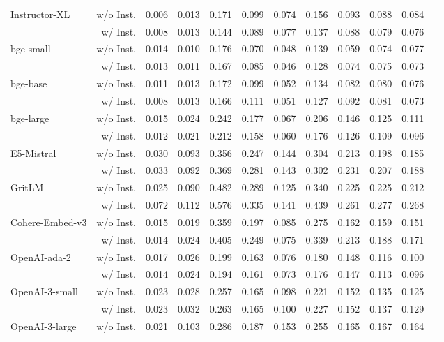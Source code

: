 \begin{table}[!tp]
{\begin{tabular}{lr|ccccccc|ccc}
\multirow{2}{*}{Instructor-XL} & w/o Inst. & 0.006 & 0.013 & 0.171 & 0.099 & 0.074 & 0.156 & 0.093 & 0.088 & 0.084 \\
& w/ Inst. & 0.008 & 0.013 & 0.144 & 0.089 & 0.077 & 0.137 & 0.088 & 0.079 & 0.076 \\
\multirow{2}{*}{bge-small} & w/o Inst. & 0.014 & 0.010 & 0.176 & 0.070 & 0.048 & 0.139 & 0.059 & 0.074 & 0.077 \\
& w/ Inst. & 0.013 & 0.011 & 0.167 & 0.085 & 0.046 & 0.128 & 0.074 & 0.075 & 0.073 \\
\multirow{2}{*}{bge-base} & w/o Inst. & 0.011 & 0.013 & 0.172 & 0.099 & 0.052 & 0.134 & 0.082 & 0.080 & 0.076 \\
& w/ Inst. & 0.008 & 0.013 & 0.166 & 0.111 & 0.051 & 0.127 & 0.092 & 0.081 & 0.073 \\
\multirow{2}{*}{bge-large} & w/o Inst. & 0.015 & 0.024 & 0.242 & 0.177 & 0.067 & 0.206 & 0.146 & 0.125 & 0.111 \\
& w/ Inst. & 0.012 & 0.021 & 0.212 & 0.158 & 0.060 & 0.176 & 0.126 & 0.109 & 0.096 \\
\multirow{2}{*}{E5-Mistral}	& w/o Inst.	&0.030	&0.093	&0.356	&0.247	&0.144	&0.304	&0.213	&0.198	&0.185\\
&w/ Inst.	&0.033	&0.092	&0.369	&0.281	&0.143	&0.302	&0.231	&0.207	&0.188\\
\multirow{2}{*}{GritLM}	& w/o Inst.	&0.025	&0.090	&0.482	&0.289	&0.125	&0.340	&0.225	&0.225	&0.212\\
&w/ Inst.	&0.072	&0.112	&0.576	&0.335	&0.141	&0.439	&0.261	&0.277	&0.268\\
\midrule
\multirow{2}{*}{Cohere-Embed-v3} & w/o Inst. & 0.015 & 0.019 & 0.359 & 0.197 & 0.085 & 0.275 & 0.162 & 0.159 & 0.151 \\
& w/ Inst. & 0.014 & 0.024 & 0.405 & 0.249 & 0.075 & 0.339 & 0.213 & 0.188 & 0.171 \\
\multirow{2}{*}{OpenAI-ada-2} & w/o Inst. & 0.017 & 0.026 & 0.199 & 0.163 & 0.076 & 0.180 & 0.148 & 0.116 & 0.100 \\
& w/ Inst. & 0.014 & 0.024 & 0.194 & 0.161 & 0.073 & 0.176 & 0.147 & 0.113 & 0.096 \\
\multirow{2}{*}{OpenAI-3-small} & w/o Inst. & 0.023 & 0.028 & 0.257 & 0.165 & 0.098 & 0.221 & 0.152 & 0.135 & 0.125 \\
& w/ Inst. & 0.023 & 0.032 & 0.263 & 0.165 & 0.100 & 0.227 & 0.152 & 0.137 & 0.129 \\
\multirow{2}{*}{OpenAI-3-large} & w/o Inst. & 0.021 & 0.103 & 0.286 & 0.187 & 0.153 & 0.255 & 0.165 & 0.167 & 0.164 \\

\end{tabular}}
\end{table}
